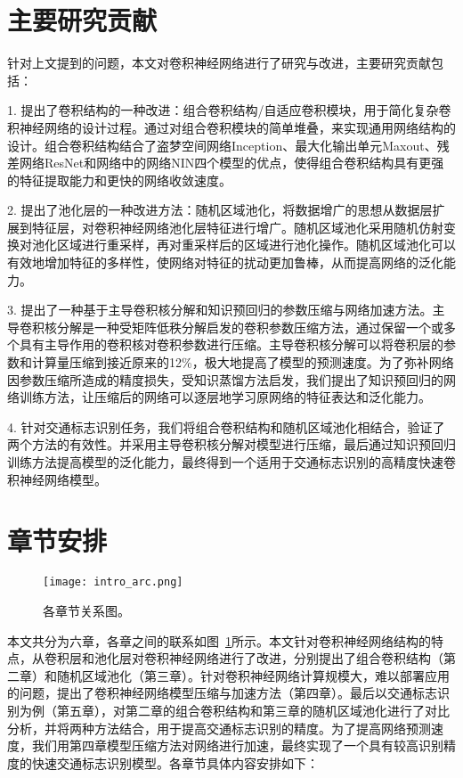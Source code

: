 \section{主要研究贡献}

针对上文提到的问题，本文对卷积神经网络进行了研究与改进，主要研究贡献包括：

1. 提出了卷积结构的一种改进：组合卷积结构/自适应卷积模块，用于简化复杂卷积神经网络的设计过程。通过对组合卷积模块的简单堆叠，来实现通用网络结构的设计。组合卷积结构结合了盗梦空间网络Inception、最大化输出单元Maxout、残差网络ResNet和网络中的网络NIN四个模型的优点，使得组合卷积结构具有更强的特征提取能力和更快的网络收敛速度。

2. 提出了池化层的一种改进方法：随机区域池化，将数据增广的思想从数据层扩展到特征层，对卷积神经网络池化层特征进行增广。随机区域池化采用随机仿射变换对池化区域进行重采样，再对重采样后的区域进行池化操作。随机区域池化可以有效地增加特征的多样性，使网络对特征的扰动更加鲁棒，从而提高网络的泛化能力。

3. 提出了一种基于主导卷积核分解和知识预回归的参数压缩与网络加速方法。主导卷积核分解是一种受矩阵低秩分解启发的卷积参数压缩方法，通过保留一个或多个具有主导作用的卷积核对卷积参数进行压缩。主导卷积核分解可以将卷积层的参数和计算量压缩到接近原来的12\%，极大地提高了模型的预测速度。为了弥补网络因参数压缩所造成的精度损失，受知识蒸馏方法启发，我们提出了知识预回归的网络训练方法，让压缩后的网络可以逐层地学习原网络的特征表达和泛化能力。

4. 针对交通标志识别任务，我们将组合卷积结构和随机区域池化相结合，验证了两个方法的有效性。并采用主导卷积核分解对模型进行压缩，最后通过知识预回归训练方法提高模型的泛化能力，最终得到一个适用于交通标志识别的高精度快速卷积神经网络模型。

\section{章节安排}


\begin{figure}[h]
\centering
\texttt{[image: intro\_arc.png]}
\caption{各章节关系图。}
\label{fig:intro_arc}
\end{figure}

本文共分为六章，各章之间的联系如图~\ref{fig:intro_arc}所示。本文针对卷积神经网络结构的特点，从卷积层和池化层对卷积神经网络进行了改进，分别提出了组合卷积结构（第二章）和随机区域池化（第三章）。针对卷积神经网络计算规模大，难以部署应用的问题，提出了卷积神经网络模型压缩与加速方法（第四章）。最后以交通标志识别为例（第五章），对第二章的组合卷积结构和第三章的随机区域池化进行了对比分析，并将两种方法结合，用于提高交通标志识别的精度。为了提高网络预测速度，我们用第四章模型压缩方法对网络进行加速，最终实现了一个具有较高识别精度的快速交通标志识别模型。各章节具体内容安排如下：

